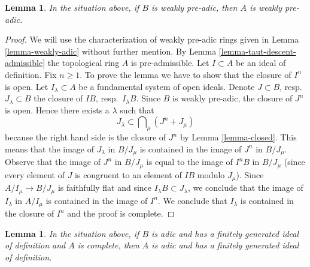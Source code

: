 \documentclass{stacks-project}
\theoremstyle{plain}
\newtheorem{lemma}[subsection]{Lemma}
\theoremstyle{definition}
\theoremstyle{remark}
\numberwithin{equation}{subsection}
\begin{document}
\begin{lemma}
\label{lemma-taut-descent-weakly-adic}
In the situation above, if $B$ is weakly pre-adic, then $A$
is weakly pre-adic.
\end{lemma}

\begin{proof}
We will use the characterization of weakly pre-adic rings given in
Lemma \ref{lemma-weakly-adic} without further mention.
By Lemma \ref{lemma-taut-descent-admissible}
the topological ring $A$ is pre-admissible.
Let $I \subset A$ be an ideal of definition.
Fix $n \geq 1$. To prove the lemma we have
to show that the closure of $I^n$ is open.
Let $I_\lambda \subset A$ be a fundamental system of open ideals.
Denote $J \subset B$, resp.\ $J_\lambda \subset B$
the closure of $IB$, resp.\ $I_\lambda B$.
Since $B$ is weakly pre-adic, the closure of $J^n$ is open.
Hence there exists a $\lambda$ such that
$$
J_\lambda \subset \bigcap\nolimits_\mu (J^n + J_\mu)
$$
because the right hand side is the closure of $J^n$ by
Lemma \ref{lemma-closed}.
This means that the image of $J_\lambda$ in $B/J_\mu$ is contained in the
image of $J^n$ in $B/J_\mu$. Observe that the image of $J^n$ in
$B/J_\mu$ is equal to the image of $I^nB$ in $B/J_\mu$ (since every element
of $J$ is congruent to an element of $IB$ modulo $J_\mu$).
Since $A/I_\mu \to B/J_\mu$ is faithfully flat and since
$I_\lambda B \subset J_\lambda$,
we conclude that the image of $I_\lambda$ in $A/I_\mu$
is contained in the image of $I^n$.
We conclude that $I_\lambda$ is contained in the closure
of $I^n$ and the proof is complete.
\end{proof}

\begin{lemma}
\label{lemma-taut-descent-adic-star}
In the situation above, if $B$ is adic and has a finitely generated
ideal of definition and $A$ is complete, then $A$ is adic and
has a finitely generated ideal of definition.
\end{lemma}
\end{document}
